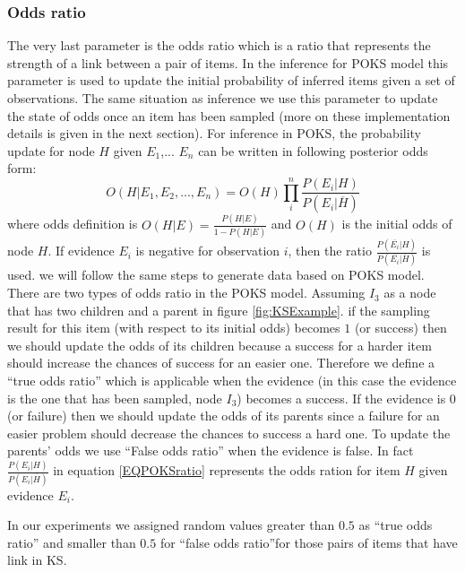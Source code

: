 \subsubsection{Odds ratio}

The very last parameter is the odds ratio which is a ratio that represents the strength of a link between a pair of items. In the inference for POKS model this parameter is used to update the initial probability of inferred items given a set of observations. The same situation as inference we use this parameter to update the state of odds once an item has been sampled (more on these implementation details is given in the next section).
For inference in POKS, the probability update for node $H$ given $E_1$,... $E_n$ can be written in following posterior odds form:
\begin{equation}
O(H|E_1,E_2, ... , E_n) = O(H) \prod_{i}^{n} \frac{P(E_i|H)}{P(E_i | \overline{H})}
\label{EQPOKSratio}
\end{equation}
where odds definition is $O(H|E) = \frac{P(H|E)}{1-P(H|E)}$ and $O(H)$ is the initial odds of node $H$. If evidence $E_i$ is negative for observation $i$, then the ratio $\frac{P(\overline{E_i}|H)}{P(\overline{E_i}|\overline{H})}$ is used. we will follow the same steps to generate data based on POKS model. 
There are two types of odds ratio in the POKS model. Assuming $I_{3}$ as a node that has two children and a parent in figure \ref{fig:KSExample}. if the sampling result for this item (with respect to its initial odds) becomes $1$ (or success) then we should update the odds of its children because a success for a harder item should increase the chances of success for an easier one. Therefore we define a ``true odds ratio'' which is applicable when the evidence (in this case the evidence is the one that has been sampled,  node $I_{3}$) becomes a success. If the evidence is $0$ (or failure) then we should update the odds of its parents since a failure for an easier problem should decrease the chances to success a hard one. To update the parents' odds we use ``False odds ratio'' when the evidence is false. In fact $\frac{P(E_i|H)}{P(E_i | \overline{H})}$ in equation \ref{EQPOKSratio} represents the odds ration for item $H$ given evidence $E_i$. 

In our experiments we assigned random values greater than $0.5$ as ``true odds ratio'' and smaller than $0.5$ for ``false odds ratio''for those pairs of items that have link in KS.


